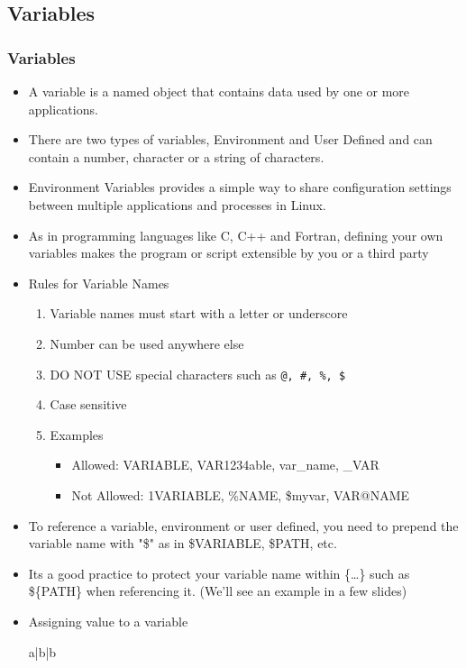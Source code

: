 \documentclass[10pt,t]{beamer}
\begin{document}
\subsection{Variables}
\begin{frame}
  \frametitle{Variables}
  \begin{itemize}
    \item A variable is a named object that contains data used by one or more applications. 
    \item There are two types of variables, Environment and User Defined and can contain  a number, character or a string of characters.
    \item Environment Variables provides a simple way to share configuration settings between multiple applications and processes in Linux.
    \item As in programming languages like C, C++ and Fortran, defining your own variables makes the program or script extensible by you or a third party
    \item Rules for Variable Names
    \begin{enumerate}
        \item Variable names must start with a letter or underscore
        \item Number can be used anywhere else
        \item DO NOT USE special characters such as \texttt{@, \#, \%, \$}
        \item Case sensitive
        \item Examples
        \begin{itemize}
          \item Allowed: VARIABLE, VAR1234able, var\_name, \_VAR
          \item Not Allowed: 1VARIABLE, \%NAME, \$myvar, VAR@NAME 
        \end{itemize}
    \end{enumerate}
    \item To reference a variable, environment or user defined, you need to prepend the variable name with "\$" as in \$VARIABLE, \$PATH, etc.
    \item Its a good practice to protect your variable name within \{\dots\} such as \$\{PATH\} when referencing it. (We'll see an example in a few slides)
    \item Assigning value to a variable
    \begin{center}
          \begin{tabular}{a|b|b}

\end{tabular}
\end{center}
\end{itemize}
\end{frame}
\end{document}
